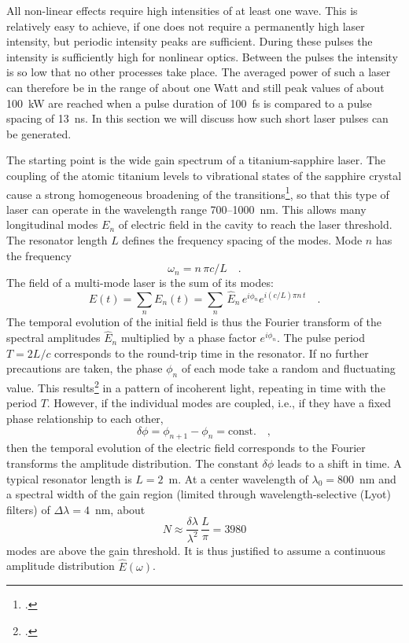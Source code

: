 All non-linear effects  require high
intensities of at least one wave. This 
is relatively
easy to achieve, if one does not require a permanently high laser intensity, but periodic
intensity peaks are sufficient. During these pulses the
intensity  is sufficiently high for nonlinear optics. Between the pulses 
the intensity is so low that no other processes take place. The averaged power of such a laser can therefore
be in the range of about one Watt and still 
peak values of about 100~kW are reached when a pulse duration of
100~fs is compared to a pulse spacing of 13~ns. In
this section we will discuss how such short
laser pulses can be generated.


The starting point is the  wide gain spectrum of a
titanium-sapphire laser. The coupling of the atomic titanium levels to
vibrational states of the sapphire crystal cause a strong
homogeneous broadening of the transitions\footcite[chapter 4]{Rulliere2005}, so that
this type of laser can operate in the wavelength range 700--1000~nm. This allows many longitudinal modes $E_n$  of
electric field in the cavity  to reach the laser threshold. The resonator length $L$ defines the frequency spacing of the
modes. Mode $n$ has the frequency 
\begin{equation}
 \omega_n = n \, \pi c / L \quad.
\end{equation}
The  field of a multi-mode laser is the sum of its
modes:
\begin{equation}
  E(t) = \sum_n E_n(t) = \sum_n \, \hat{E}_n \, e^{i \phi_n} e^{i (c/L) \pi n \, t} \quad .
\end{equation}
The temporal evolution of the initial field is thus  the Fourier transform of the  spectral amplitudes $\hat{E}_n$ multiplied by a phase factor $e^{i \phi_n} $. The pulse period  $T = 2L /c$  corresponds to the round-trip  time in the resonator.
If no further precautions are taken, the
phase $\phi_n$ of each mode take a random  and fluctuating value. This
results\footcite{DielsRudolph1996} in a  pattern of incoherent light, repeating in time with the period $T$.
However, if the individual modes are coupled, i.e., if they 
have a fixed phase relationship to each other,
\begin{equation}
   \delta \phi = \phi_{n+1} - \phi_n = \text{const.} \quad,
   \label{eq:fwm:gl_fwm_phiconst}
\end{equation}
then the temporal evolution of the electric field corresponds to the
Fourier transforms the amplitude distribution. The constant
$\delta \phi$ leads to a shift in  time. A typical resonator length is $L = 2$~m. At
a center wavelength of $\lambda_0 = 800$~nm and a
spectral width of the gain region (limited through 
wavelength-selective  (Lyot) filters) of $\Delta \lambda =
4$~nm, about
\begin{equation}
 N \approx \frac{\delta \lambda}{ \lambda^2} \, \frac{L}{\pi} =
 3980
\end{equation}
modes are above the gain threshold. It is thus justified to assume  a
continuous amplitude distribution $\hat{E}(\omega)$.

